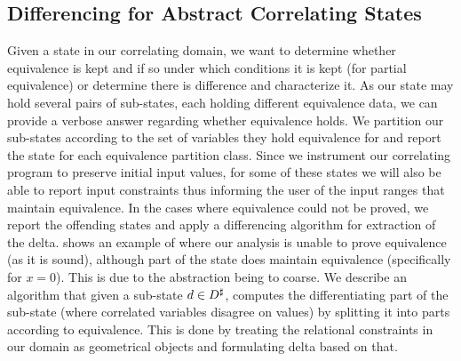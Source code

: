 \subsection{Differencing for Abstract Correlating States} 
Given a state in our correlating domain, we want to determine whether equivalence is kept and if so under which conditions it is kept (for partial equivalence) or determine there is difference and characterize it. As our state may hold several pairs of sub-states, each holding different equivalence data, we can provide a verbose answer regarding whether equivalence holds. We partition our sub-states according to the set of variables they hold equivalence for and report the state for each equivalence partition class. Since we instrument our correlating program to preserve initial input values, for some of these states we will also be able to report input constraints thus informing the user of the input ranges that maintain equivalence. In the cases where equivalence could not be proved, we report the offending states and apply a differencing algorithm for extraction of the delta.  shows an example of where our analysis is unable to prove equivalence (as it is sound), although part of the state does maintain equivalence (specifically for $x=0$). This is due to the abstraction being to coarse. We describe an algorithm that given a sub-state $d \in D^\sharp$, computes the differentiating part of the sub-state (where correlated variables disagree on values) by splitting it into parts according to equivalence. This is done by treating the relational constraints in our domain as geometrical objects and formulating delta based on that.

